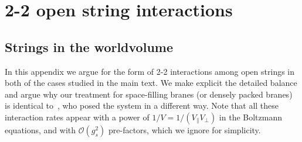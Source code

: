 \documentclass[a4paper,11pt]{article}
\begin{document}
\section{2-2 open string interactions}\label{sec:22openstrings}

\subsection{Strings in the worldvolume}

In this appendix we argue for the form of 2-2 interactions among open strings in both of the cases studied in the main text. 
We make explicit the detailed balance and argue why our treatment for space-filling branes (or densely packed branes) is identical to~\cite{Lee:1997iz}, who posed the system in a different way. Note that all these interaction rates appear with a power of $1/V=1/(V_\| V_\perp)$ in the Boltzmann equations, and with $\mathcal{O}(g_s^2)$ pre-factors, which we ignore for simplicity.
\end{document}
